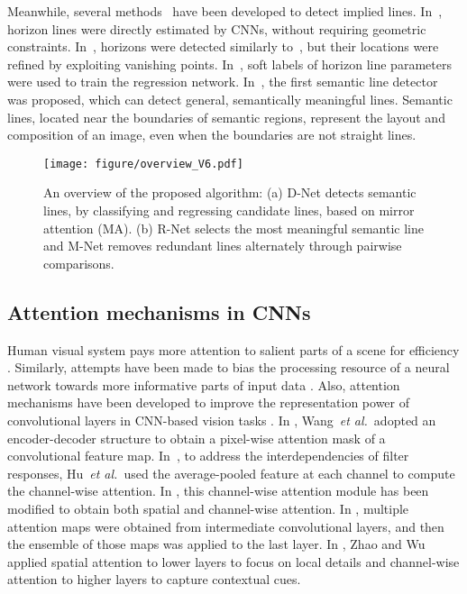 \documentclass[runningheads]{llncs}
\newcommand{\etal}{\textit{et al.}}
\begin{document}
Meanwhile, several methods~\cite{workman2016,zhai2016,lee2017,diaz2019} have been developed to detect implied lines. In~\cite{workman2016}, horizon lines were directly estimated by CNNs, without requiring geometric constraints. In~\cite{zhai2016}, horizons were detected similarly to~\cite{workman2016}, but their locations were refined by exploiting vanishing points. In~\cite{diaz2019}, soft labels of horizon line parameters were used to train the regression network. In~\cite{lee2017}, the first semantic line detector was proposed, which can detect general, semantically meaningful lines. Semantic lines, located near the boundaries of semantic regions, represent the layout and composition of an image, even when the boundaries are not straight lines.


\begin{figure*}[t]

  \centering
  \texttt{[image: figure/overview\_V6.pdf]}
  \caption{An overview of the proposed algorithm: (a) D-Net detects semantic lines, by classifying and regressing candidate lines, based on mirror attention (MA). (b) R-Net selects the most meaningful semantic line and M-Net removes redundant lines alternately through pairwise comparisons.}
  \label{fig:overview_fig}

\end{figure*}

\subsection{Attention mechanisms in CNNs}
Human visual system pays more attention to salient parts of a scene for efficiency \cite{corbetta2002control,itti1998model}. Similarly, attempts have been made to bias the processing resource of a neural network towards more informative parts of input data \cite{bahdanau2015neural,Ashish2017,zambaldi2018deep,yu2018qanet}. Also, attention mechanisms have been developed to improve the representation power of convolutional layers in CNN-based vision tasks \cite{wang2017,hu2018,woo2018,Park2018_BMVC,Zhao2019_CVPR}. In \cite{wang2017}, Wang~\etal~adopted an encoder-decoder structure to obtain a pixel-wise attention mask of a convolutional feature map. In~\cite{hu2018}, to address the interdependencies of filter responses, Hu~\etal~used the average-pooled feature at each channel to compute the channel-wise attention. In \cite{woo2018,Park2018_BMVC}, this channel-wise attention module has been modified to obtain both spatial and channel-wise attention. In \cite{Jetley2018_ICLR}, multiple attention maps were obtained from intermediate convolutional layers, and then the ensemble of those maps was applied to the last layer. In \cite{Zhao2019_CVPR}, Zhao and Wu applied spatial attention to lower layers to focus on local details and channel-wise attention to higher layers to capture contextual cues.
\end{document}
